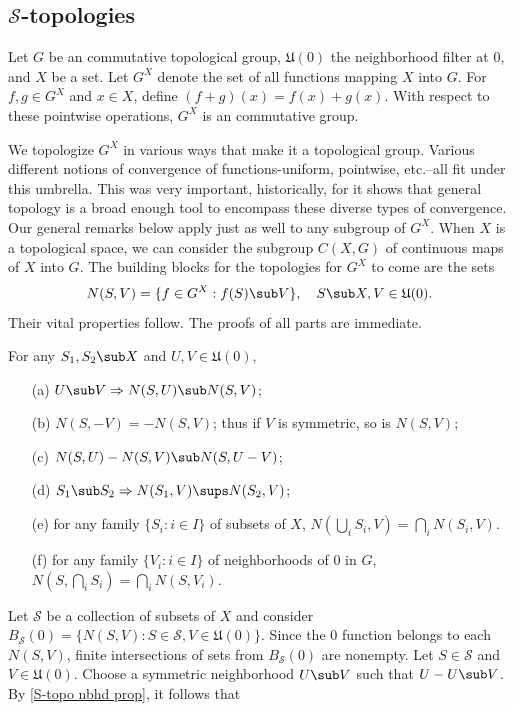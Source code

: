 \subsection{\texorpdfstring{$\mathcal{S}$}{S}-topologies}
Let $G$ be an commutative topological group, $\mathfrak{U}(0)$ the neighborhood filter at $0$, and $X$ be a set. Let $G^X$ denote the set of all functions mapping $X$ into $G$. For $f,g\in G^X$ and $x\in X$, define $(f+g)(x)=f(x)+g(x)$. With respect to these pointwise operations, $G^X$ is an commutative group.\par
We topologize $G^X$ in various ways that make it a topological group. Various different notions of convergence of functions-uniform, pointwise, etc.--all fit under this umbrella. This was very important, historically, for it shows that general topology is a broad enough tool to encompass these diverse types of convergence. Our general remarks below apply just as well to any subgroup of $G^X$. When $X$ is a topological space, we can consider the subgroup $C(X,G)$ of continuous maps of $X$ into $G$. The building blocks for the topologies for $G^X$ to come are the sets
\[N(S,V)=\{f\in G^X:f(S)\sub V\},\quad S\sub X,V\in\mathfrak{U}(0).\]
Their vital properties follow. The proofs of all parts are immediate.
\begin{proposition}\label{S-topo nbhd prop}
For any $S_1,S_2\sub X$ and $U,V\in\mathfrak{U}(0)$,
\begin{itemize}
\item[(a)] $U\sub V\Rightarrow N(S,U)\sub N(S,V)$;
\item[(b)] $N(S,-V)=-N(S,V)$; thus if $V$ is symmetric, so is $N(S,V)$;
\item[(c)] $N(S,U)-N(S,V)\sub N(S,U-V)$;
\item[(d)] $S_1\sub S_2\Rightarrow N(S_1,V)\sups N(S_2,V)$;
\item[(e)] for any family $\{S_i:i\in I\}$ of subsets of $X$, $N(\bigcup_iS_i,V)=\bigcap_iN(S_i,V)$.
\item[(f)] for any family $\{V_i:i\in I\}$ of neighborhoods of $0$ in $G$, $N(S,\bigcap_iS_i)=\bigcap_iN(S,V_i)$.
\end{itemize}
\end{proposition}
Let $\mathcal{S}$ be a collection of subsets of $X$ and consider $B_{\mathcal{S}}(0)=\{N(S,V):S\in\mathcal{S},V\in\mathfrak{U}(0)\}$. Since the $0$ function belongs to each $N(S,V)$, finite intersections of sets from $B_{\mathcal{S}}(0)$ are nonempty. Let $S\in\mathcal{S}$ and $V\in\mathfrak{U}(0)$. Choose a symmetric neighborhood $U\sub V$ such that $U-U\sub V$. By \cref{S-topo nbhd prop}, it follows that
